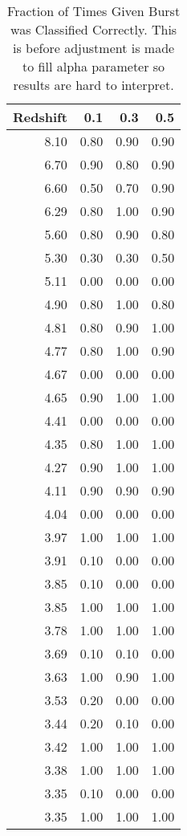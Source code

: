\begin{table}[H]
\begin{center}
\begin{tabular}{rrrr}
  \hline
Redshift & 0.1 & 0.3 & 0.5 \\ 
  \hline
8.10 & 0.80 & 0.90 & 0.90 \\ 
  6.70 & 0.90 & 0.80 & 0.90 \\ 
  6.60 & 0.50 & 0.70 & 0.90 \\ 
  6.29 & 0.80 & 1.00 & 0.90 \\ 
  5.60 & 0.80 & 0.90 & 0.80 \\ 
  5.30 & 0.30 & 0.30 & 0.50 \\ 
  5.11 & 0.00 & 0.00 & 0.00 \\ 
  4.90 & 0.80 & 1.00 & 0.80 \\ 
  4.81 & 0.80 & 0.90 & 1.00 \\ 
  4.77 & 0.80 & 1.00 & 0.90 \\ 
  4.67 & 0.00 & 0.00 & 0.00 \\ 
  4.65 & 0.90 & 1.00 & 1.00 \\ 
  4.41 & 0.00 & 0.00 & 0.00 \\ 
  4.35 & 0.80 & 1.00 & 1.00 \\ 
  4.27 & 0.90 & 1.00 & 1.00 \\ 
  4.11 & 0.90 & 0.90 & 0.90 \\ 
  4.04 & 0.00 & 0.00 & 0.00 \\ 
  3.97 & 1.00 & 1.00 & 1.00 \\ 
  3.91 & 0.10 & 0.00 & 0.00 \\ 
  3.85 & 0.10 & 0.00 & 0.00 \\ 
  3.85 & 1.00 & 1.00 & 1.00 \\ 
  3.78 & 1.00 & 1.00 & 1.00 \\ 
  3.69 & 0.10 & 0.10 & 0.00 \\ 
  3.63 & 1.00 & 0.90 & 1.00 \\ 
  3.53 & 0.20 & 0.00 & 0.00 \\ 
  3.44 & 0.20 & 0.10 & 0.00 \\ 
  3.42 & 1.00 & 1.00 & 1.00 \\ 
  3.38 & 1.00 & 1.00 & 1.00 \\ 
  3.35 & 0.10 & 0.00 & 0.00 \\ 
  3.35 & 1.00 & 1.00 & 1.00 \\ 
   \hline
\end{tabular}
\caption{Fraction of Times Given Burst was Classified Correctly. This is before adjustment is made to fill alpha parameter so results are hard to interpret.}
\end{center}
\end{table}

